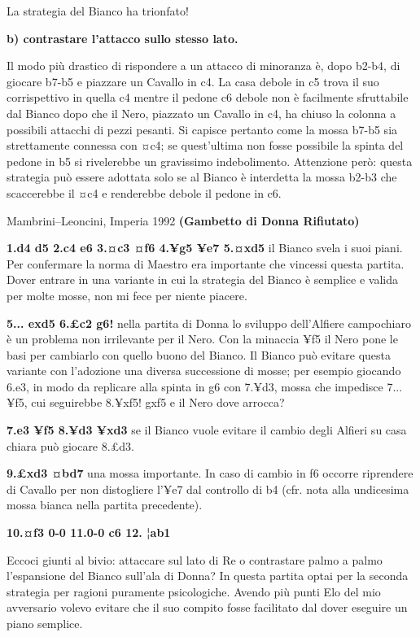 La strategia del Bianco ha trionfato!

\textbf{b) contrastare l'attacco sullo stesso lato.}

Il modo più drastico di rispondere a un attacco di minoranza è, dopo
b2-b4, di giocare b7-b5 e piazzare un Cavallo in c4. La casa debole in
c5 trova il suo corrispettivo in quella c4 mentre il pedone c6 debole
non è facilmente sfruttabile dal Bianco dopo che il Nero, piazzato un
Cavallo in c4, ha chiuso la colonna a possibili attacchi di pezzi
pesanti. Si capisce pertanto come la mossa b7-b5 sia strettamente
connessa con ¤c4; se quest'ultima non fosse possibile la spinta del
pedone in b5 si rivelerebbe un gravissimo indebolimento. Attenzione
però: questa strategia può essere adottata solo se al Bianco è
interdetta la mossa b2-b3 che scaccerebbe il ¤c4 e renderebbe debole il
pedone in c6.

Mambrini--Leoncini, Imperia 1992 \textbf{(Gambetto di Donna Rifiutato)}

\textbf{1.d4 d5 2.c4 e6 3.¤c3 ¤f6 4.¥g5 ¥e7 5.¤xd5} il Bianco svela i
suoi piani. Per confermare la norma di Maestro era importante che
vincessi questa partita. Dover entrare in una variante in cui la
strategia del Bianco è semplice e valida per molte mosse, non mi fece
per niente piacere.

\textbf{5... exd5 6.£c2 g6!} nella partita di Donna lo sviluppo
dell'Alfiere campochiaro è un problema non irrilevante per il Nero. Con
la minaccia ¥f5 il Nero pone le basi per cambiarlo con quello buono del
Bianco. Il Bianco può evitare questa variante con l'adozione una diversa
successione di mosse; per esempio giocando 6.e3, in modo da replicare
alla spinta in g6 con 7.¥d3, mossa che impedisce 7... ¥f5, cui
seguirebbe 8.¥xf5! gxf5 e il Nero dove arrocca?

\textbf{7.e3 ¥f5 8.¥d3 ¥xd3} se il Bianco vuole evitare il cambio degli
Alfieri su casa chiara può giocare 8.£d3.

\textbf{9.£xd3 ¤bd7} una mossa importante. In caso di cambio in f6
occorre riprendere di Cavallo per non distogliere l'¥e7 dal controllo di
b4 (cfr. nota alla undicesima mossa bianca nella partita precedente).

\textbf{10.¤f3 0-0 11.0-0 c6 12. ¦ab1}


Eccoci
giunti al bivio: attaccare sul lato di Re o contrastare palmo a palmo
l'espansione del Bianco sull'ala di Donna? In questa partita optai per
la seconda strategia per ragioni puramente psicologiche. Avendo più
punti Elo del mio avversario volevo evitare che il suo compito fosse
facilitato dal dover eseguire un piano semplice.

